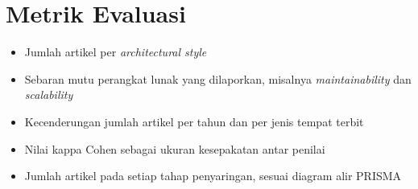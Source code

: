 \documentclass[11pt,a4paper]{article}
\begin{document}
\section{Metrik Evaluasi}

\begin{itemize}[leftmargin=*]
  \item Jumlah artikel per \textit{architectural style}
  \item Sebaran mutu perangkat lunak yang dilaporkan, misalnya \textit{maintainability} dan \textit{scalability}
  \item Kecenderungan jumlah artikel per tahun dan per jenis tempat terbit
  \item Nilai kappa Cohen sebagai ukuran kesepakatan antar penilai
  \item Jumlah artikel pada setiap tahap penyaringan, sesuai diagram alir PRISMA
\end{itemize}



\end{document}
